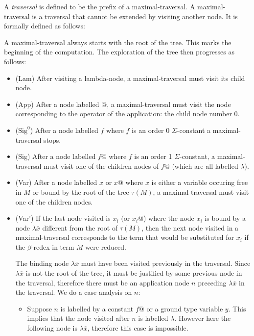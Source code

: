 A \emph{traversal} is defined to be the prefix of a maximal-traversal.
A maximal-traversal is a traversal that cannot be extended by visiting another node. It is formally defined as follows:
\begin{dfn}
A maximal-traversal always starts with the root of the tree. This marks the beginning of the computation.
The exploration of the tree then progresses as follows:
\begin{itemize}
\item (Lam) After visiting a lambda-node, a maximal-traversal must visit its child node.

\item (App) After a node labelled $@$, a maximal-traversal must visit the node
corresponding to the operator of the application: the child node number $0$.

\item ($\mbox{Sig}^0$) After a node labelled $f$ where $f$ is an order 0 $\Sigma$-constant a maximal-traversal stops.

\item (Sig) After a node labelled $f@$ where $f$ is an order 1 $\Sigma$-constant,
a maximal-traversal must visit one of the children nodes of $f@$ (which are all labelled $\lambda$).

\item (Var) After a node labelled $x$ or $x@$ where $x$ is either a variable occuring free in $M$
or bound by the root of the tree $\tau(M)$, a maximal-traversal must visit one of the children nodes.

\item (Var') If the last node visited is $x_i$ (or $x_i@$) where the node $x_i$ is bound by a node $\lambda \overline{x}$
different from the root of $\tau(M)$, then the next node visited in a maximal-traversal
corresponds to the term that would be substituted for $x_i$ if the $\beta$-redex
in term $M$ were reduced.

The binding node $\lambda \overline{x}$ must have been visited previously in the traversal.
Since $\lambda \overline{x}$ is not the root of the tree, it must be justified by some previous node in the traversal,
therefore there must be an application node $n$ preceding $\lambda \overline{x}$ in the traversal. We do a case analysis
on $n$:

    \begin{itemize}
    \item Suppose $n$ is labelled by a constant $f@$ or a ground type variable $y$. This implies
    that the node visited after $n$ is labelled $\lambda$. However here the following node is $\lambda \overline{x}$,
    therefore this case is impossible.


\end{itemize}
\end{itemize}
\end{dfn}
